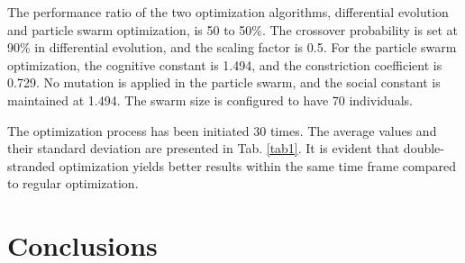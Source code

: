 \documentclass[runningheads]{llncs}
\begin{document}
The performance ratio of the two optimization algorithms, differential evolution and particle swarm optimization, is 50 to 50\%. The crossover probability is set at 90\% in differential evolution, and the scaling factor is 0.5. For the particle swarm optimization, the cognitive constant is 1.494, and the constriction coefficient is 0.729. No mutation is applied in the particle swarm, and the social constant is maintained at 1.494. The swarm size is configured to have 70 individuals.

\begin{table}
\caption{Experimental results}\label{tab1}
\centering
{}
\end{table}

The optimization process has been initiated 30 times. The average values and their standard deviation are presented in Tab. \ref{tab1}. It is evident that double-stranded optimization yields better results within the same time frame compared to regular optimization.

\section{Conclusions}
\end{document}
